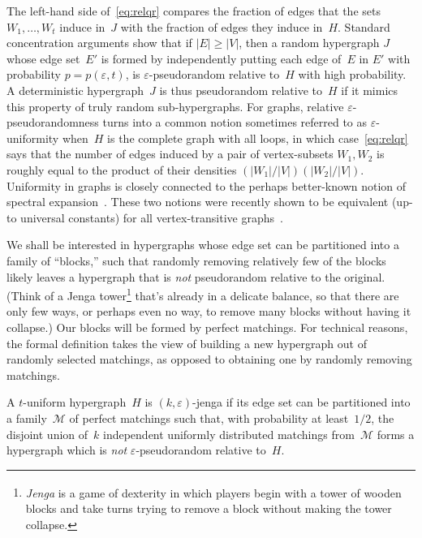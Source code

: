\documentclass{toc}
\newcommand{\eps}{\varepsilon}
\begin{document}
The left-hand side of~\eqref{eq:relqr} compares the fraction of edges that the sets $W_1,\dots,W_t$ induce in~$J$ with the fraction of edges they induce in~$H$.
Standard concentration arguments show that if $|E| \geq |V|$, then a random hypergraph $J$ whose edge set~$E'$ is formed by independently putting each edge of~$E$ in $E'$ with probability $p = p(\eps,t)$, is $\eps$-pseudorandom relative to~$H$ with high probability.
A deterministic hypergraph~$J$ is thus pseudorandom relative to~$H$ if it mimics this property of truly random sub-hypergraphs.
For graphs, relative $\eps$-pseudorandomness turns into a common notion sometimes referred to as $\eps$-uniformity when~$H$ is the complete graph with all loops, in which case~\eqref{eq:relqr} says that the number of edges induced by a pair of vertex-subsets $W_1,W_2$ is roughly equal to the product of their densities $(|W_1|/|V|)(|W_2|/|V|)$.
Uniformity in graphs is closely connected to the perhaps better-known notion of spectral expansion~\cite{Hoory:2006}.
These two notions were recently shown to be equivalent  (up-to universal constants) for all vertex-transitive graphs~\cite{Conlon:2016}.

We shall be interested in hypergraphs whose edge set can be partitioned into a family of ``blocks,'' such that randomly removing relatively few of the blocks  likely leaves a hypergraph that is \emph{not} pseudorandom relative to the original.
(Think of a Jenga tower\footnote{\emph{Jenga}\textsuperscript{\textregistered} is a game of dexterity in which players begin with a tower of wooden blocks and take turns trying to remove a block without making the tower collapse.} that's already in a delicate balance, so that there are only few ways, or perhaps even no way, to remove many blocks without having it collapse.)
Our blocks will be formed by perfect matchings.
For technical reasons, the formal definition takes the view of building a new hypergraph out of randomly selected matchings, as opposed to obtaining one by randomly removing matchings.

\begin{definition}
A $t$-uniform hypergraph~$H$ is $(k,\eps)$-jenga if its edge set can be partitioned into a family~$\mathcal M$ of perfect matchings
such that, with probability at least~$1/2$, the disjoint union of~$k$ independent uniformly distributed matchings from~$\mathcal M$ forms a hypergraph which is \emph{not} $\eps$-pseudorandom relative to~$H$.
\end{definition}
\end{document}
